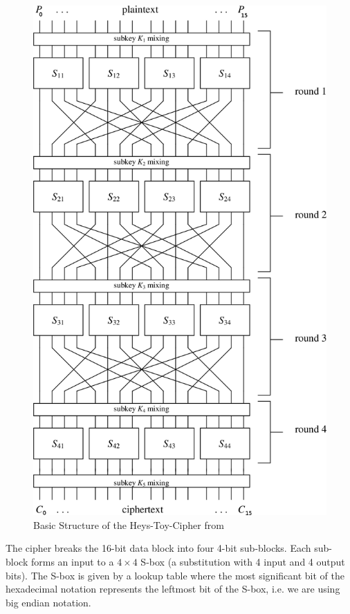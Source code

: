 \begin{figure}[ht]
 \centering
 \includegraphics[height=0.6\textheight]{./heys-toy-cipher.png}
 \caption{Basic Structure of the Heys-Toy-Cipher from \cite{Heys2002}}
 \label{fig:htc}
\end{figure}


The cipher breaks the 16-bit data block into four 4-bit sub-blocks. Each sub-block forms an input to a $4\times4$ S-box (a substitution with 4 input and 4 output bits). The S-box is given by a lookup table where the most significant bit of the hexadecimal notation represents the leftmost bit of the S-box, i.e. we are using big endian notation.

